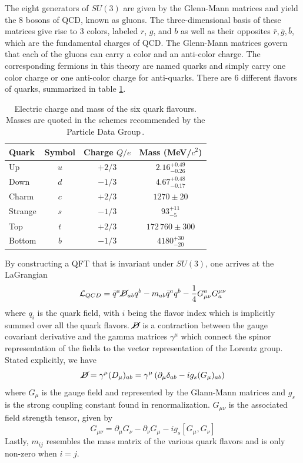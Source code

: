 The eight generators of $SU(3)$ are given by the Glenn-Mann matrices and yield the 8 bosons of QCD, known as gluons. The three-dimensional basis of these matrices give rise to 3 colors, labeled $r$, $g$, and $b$ as well as their opposites $\bar{r}, \bar{g}, \bar{b}$, which are the fundamental charges of QCD. The Glenn-Mann matrices govern that each of the gluons can carry a color and an anti-color charge. The corresponding fermions in this theory are named quarks and simply carry one color charge or one anti-color charge for anti-quarks. There are 6 different flavors of quarks, summarized in table \ref{tab:quark_masses}. 

\begin{table}[htbp]
    \centering
    \begin{tabular}{@{}lccc@{}}
      \toprule
      Quark & Symbol & Charge $Q/e$ & Mass (MeV/$c^{2}$) \\ 
      \midrule
      Up     & $u$ & $+2/3$ & $2.16^{+0.49}_{-0.26}$ \\
      Down   & $d$ & $-1/3$ & $4.67^{+0.48}_{-0.17}$ \\
      Charm  & $c$ & $+2/3$ & $1270 \pm 20$ \\
      Strange& $s$ & $-1/3$ & $93^{+11}_{-5}$ \\
      Top    & $t$ & $+2/3$ & $172\,760 \pm 300$ \\
      Bottom & $b$ & $-1/3$ & $4180^{+30}_{-20}$ \\
      \bottomrule
    \end{tabular}
    \caption{Electric charge and mass of the six quark flavours.
             Masses are quoted in the schemes recommended by the
             Particle Data Group\,\cite{ref:pdg2024}.}
    \label{tab:quark_masses}
  \end{table}


By constructing a QFT that is invariant under $SU(3)$, one arrives at the LaGrangian
\begin{equation}
    \mathcal{L}_{{QCD}} = \bar{q}^a\cancel{D}_{ab}q^b - m_{ab}\bar{q}^aq^b - \frac{1}{4}G^a_{\mu\nu}G_a^{\mu\nu}
\end{equation}
where $q_i$ is the quark field, with $i$ being the flavor index which is implicitly summed over all the quark flavors. $\cancel{D}$ is a contraction between the gauge covariant derivative and the gamma matrices $\gamma^\mu$ which connect the spinor representation of the fields to the vector representation of the Lorentz group. Stated explicitly, we have
\begin{equation}
    \cancel{D} = \gamma^\mu (D_\mu)_{ab} = \gamma^\mu\left( \partial_\mu \delta_{ab}  - ig_s(G_\mu)_{ab}\right)
\end{equation}
where $G_\mu$ is the gauge field and represented by the Glann-Mann matrices and $g_s$ is the strong coupling constant found in renormalization. $G_{\mu\nu}$ is the associated field strength tensor, given by
\begin{equation}
G_{\mu\nu} = \partial_\mu G_\nu - \partial_\nu G_\mu - ig_s[G_\mu, G_\nu]
\end{equation}
Lastly, $m_{ij}$ resembles the mass matrix of the various quark flavors and is only non-zero when $i=j$.

